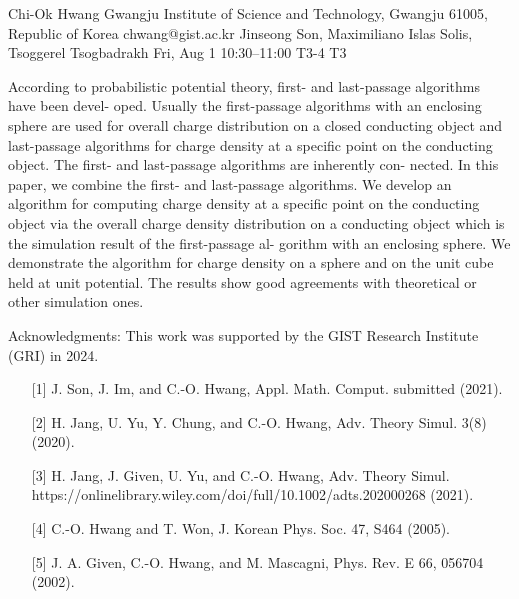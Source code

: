 \begin{talk}
  {Chi-Ok Hwang}%
  {Gwangju Institute of Science and Technology, Gwangju 61005, Republic of Korea}%
  {chwang@gist.ac.kr}%
  {Jinseong Son, Maximiliano Islas Solis, Tsoggerel Tsogbadrakh}%
  {}%
  {}%
  {Fri, Aug 1 10:30–11:00}%
  {T3-4}%
  {T3}%
  
				
			
According to probabilistic potential theory, first- and last-passage algorithms have been devel-
oped. Usually the first-passage algorithms with an enclosing sphere are used for overall charge
distribution on a closed conducting object and last-passage algorithms for charge density at a
specific point on the conducting object. The first- and last-passage algorithms are inherently con-
nected. In this paper, we combine the first- and last-passage algorithms. We develop an algorithm
for computing charge density at a specific point on the conducting object via the overall charge
density distribution on a conducting object which is the simulation result of the first-passage al-
gorithm with an enclosing sphere. We demonstrate the algorithm for charge density on a sphere
and on the unit cube held at unit potential. The results show good agreements with theoretical or
other simulation ones.


\medskip

Acknowledgments: This work was supported by the GIST Research Institute (GRI) in 2024.
\begin{enumerate}
	\item[{[1]}] J. Son, J. Im, and C.-O. Hwang, Appl. Math. Comput. submitted (2021).
	\item[{[2]}] H. Jang, U. Yu, Y. Chung, and C.-O. Hwang, Adv. Theory Simul. 3(8) (2020).
	\item[{[3]}] H. Jang, J. Given, U. Yu, and C.-O. Hwang, Adv. Theory Simul.
	https://onlinelibrary.wiley.com/doi/full/10.1002/adts.202000268 (2021).
	\item[{[4]}] C.-O. Hwang and T. Won, J. Korean Phys. Soc. 47, S464 (2005).
	\item[{[5]}] J. A. Given, C.-O. Hwang, and M. Mascagni, Phys. Rev. E 66, 056704 (2002).
\end{enumerate}


\end{talk}

